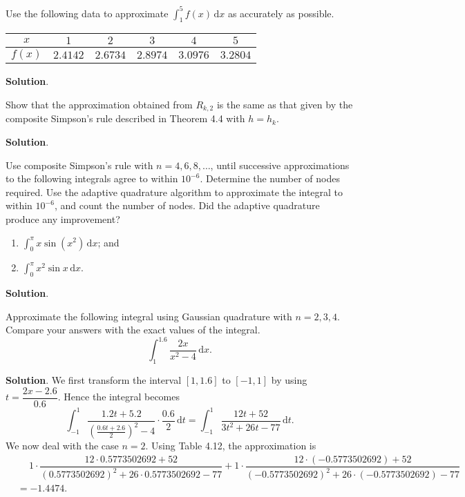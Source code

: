 \documentclass[11pt]{article}
\theoremstyle{break}
\newcommand{\ddi}{\text{$\,$d}}
\numberwithin{equation}{theorem}
\begin{document}
\newpage
\begin{problem}\label{problem 11} %
    Use the following data to approximate $\displaystyle\int_1^5 f(x)\ddi x$ as accurately as possible.
    \begin{center}
        \begin{tabular}{c|c|c|c|c|c}
            $x$ & $1$ & $2$ & $3$ & $4$ & $5$ \\
            \hline
            $f(x)$ & $2.4142$ & $2.6734$ & $2.8974$ & $3.0976$ & $3.2804$
        \end{tabular}
    \end{center}
\end{problem}
\textbf{Solution}. 


\newpage
\begin{problem}\label{problem 12} %
    Show that the approximation obtained from $R_{k,2}$ is the same as that given by the composite Simpson's rule described in Theorem 4.4 with $h=h_k$.
\end{problem}
\textbf{Solution}. 


\newpage
\begin{problem}\label{problem 13} %
    Use composite Simpson's rule with $n=4, 6, 8,\dots$, until successive approximations to the following integrals agree to within $10^{-6}$. Determine the number of nodes required. Use the adaptive quadrature algorithm to approximate the integral to within $10^{-6}$, and count the number of nodes. Did the adaptive quadrature produce any improvement? \vspace{-1em}
    \begin{multicols}{2}
        \begin{enumerate}
            \item $\displaystyle\int_{0}^{\pi}x\sin(x^2)\ddi x$; and
            \item $\displaystyle\int_{0}^{\pi}x^2\sin x\ddi x$.
        \end{enumerate}
    \end{multicols}
    \vspace{0.1em}
\end{problem}
\textbf{Solution}. 


\newpage
\begin{problem}\label{problem 14} %
    Approximate the following integral using Gaussian quadrature with $n=2, 3, 4$. Compare your answers with the exact values of the integral. $$\int_{1}^{1.6}\dfrac{2x}{x^2-4}\ddi x.$$
\end{problem}
\textbf{Solution}. We first transform the interval $[1, 1.6]$ to $[-1, 1]$ by using $t=\dfrac{2x-2.6}{0.6}$. Hence the integral becomes $$\int_{-1}^{1}\dfrac{1.2t+5.2}{\left(\frac{0.6t+2.6}{2}\right)^2-4}\cdot\dfrac{0.6}{2}\ddi t=\int_{-1}^{1}\dfrac{12t+52}{3t^2+26t-77}\ddi t.$$ We now deal with the case $n=2$. Using Table 4.12, the approximation is \begin{align*}
    &\quad\ 1\cdot\dfrac{12\cdot 0.5773502692+52}{(0.5773502692)^2+26\cdot0.5773502692-77}+1\cdot\dfrac{12\cdot (-0.5773502692)+52}{(-0.5773502692)^2+26\cdot(-0.5773502692)-77}\\
    &=-1.4474.
\end{align*}
\end{document}
